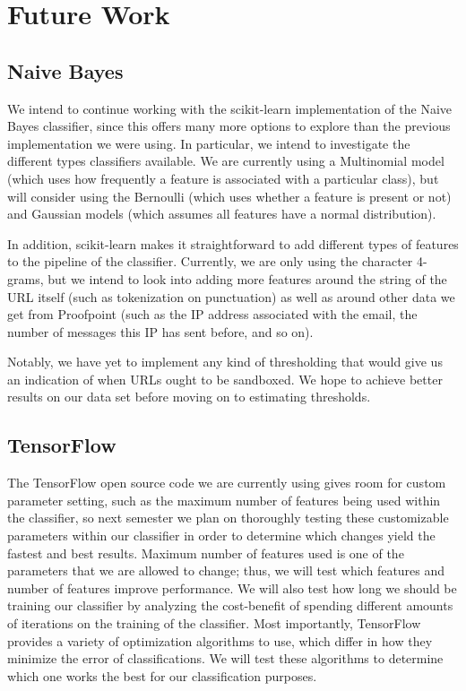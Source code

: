 \documentclass[cs,midyearupdate]{hmcclinic}
\begin{document}

\section{Future Work}

\subsection{Naive Bayes}

We intend to continue working with the scikit-learn implementation of the Naive Bayes classifier, since this offers many more options to explore than the previous implementation we were using. In particular, we intend to investigate the different types classifiers available. We are currently using a Multinomial model (which uses how frequently a feature is associated with a particular class), but will consider using the Bernoulli (which uses whether a feature is present or not) and Gaussian models (which assumes all features have a normal distribution).

In addition, scikit-learn makes it straightforward to add different types of features to the pipeline of the classifier. Currently, we are only using the character 4-grams, but we intend to look into adding more features around the string of the URL itself (such as tokenization on punctuation) as well as around other data we get from Proofpoint (such as the IP address associated with the email, the number of messages this IP has sent before, and so on).

Notably, we have yet to implement any kind of thresholding that would give us an indication of when URLs ought to be sandboxed. We hope to achieve better results on our data set before moving on to estimating thresholds.

\subsection{TensorFlow}

The TensorFlow open source code we are currently using gives room for custom parameter setting, such as the maximum number of features being used within the classifier, so next semester we plan on thoroughly testing these customizable parameters within our classifier in order to determine which changes yield the fastest and best results. Maximum number of features used is one of the parameters that we are allowed to change; thus, we will test which features and number of features improve performance. We will also test how long we should be training our classifier by analyzing the cost-benefit of spending different amounts of iterations on the training of the classifier. Most importantly, TensorFlow provides a variety of optimization algorithms to use, which differ in how they minimize the error of classifications. We will test these algorithms to determine which one works the best for our classification purposes.
\end{document}
